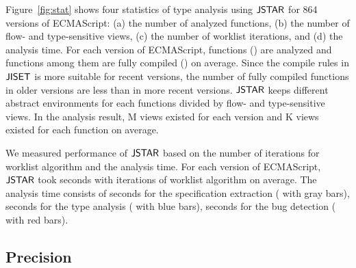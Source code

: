 Figure~\ref{fig:stat} shows four statistics of type analysis using $\tool$ for
864 versions of ECMAScript: (a) the number of analyzed functions, (b) the number
of flow- and type-sensitive views, (c) the number of worklist iterations, and
(d) the analysis time.  For each version of ECMAScript, 
functions () are analyzed and  functions among them
are fully compiled () on average.  Since the compile rules in
$\jiset$ is more suitable for recent versions, the number of fully compiled
functions in older versions are less than in more recent versions.  $\tool$
keeps different abstract environments for each functions divided by flow- and
type-sensitive views.  In the analysis result, M views existed for
each version and K views existed for each function on average.

We measured performance of $\tool$ based on the number of iterations for
worklist algorithm and the analysis time.  For each version of ECMAScript,
$\tool$ took  seconds with  iterations of worklist
algorithm on average.  The analysis time consists of  seconds for
the specification extraction ( with gray bars), 
seconds for the type analysis ( with blue bars), 
seconds for the bug detection ( with red bars).


\subsection{Precision}\label{sec:precision}

\begin{table}
  \centering
  \caption{The creators and resolvers of true bugs.}
  \label{table:author}
  \vspace*{-1.5em}
\end{table}

